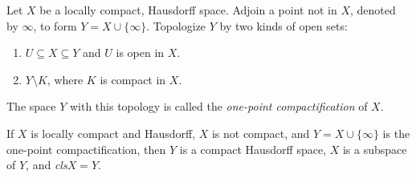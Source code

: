 \label{oneptcompactification}
Let $X$ be a locally compact, Hausdorff space. Adjoin a point not in $X$, denoted by $\infty$, to form $Y = X \cup \{ \infty \}$.
Topologize $Y$ by two kinds of open sets:
\begin{enumerate}
  \item $U \subseteq X \subseteq Y$ and $U$ is open in $X$.
  \item $Y \setminus K$, where $K$ is compact in $X$.
\end{enumerate}
The space $Y$ with this topology is called the \emph{one-point compactification} of $X$.

\begin{theorem}
If $X$ is locally compact and Hausdorff, $X$ is not compact, and $Y = X \cup \{ \infty \}$ is the one-point compactification, then $Y$ is a compact Hausdorff space, $X$
is a subspace of $Y$, and \emph{cls}$X = Y$.
\end{theorem}